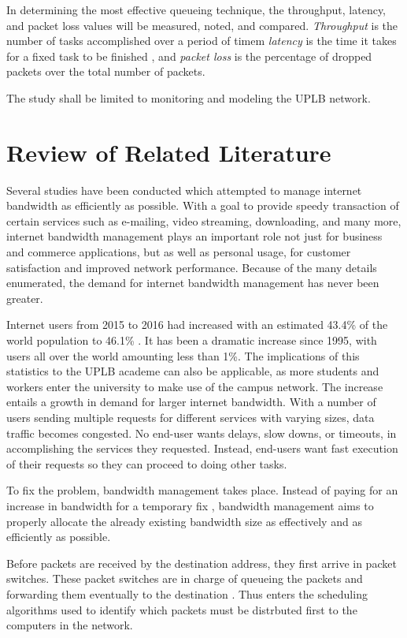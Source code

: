 \documentclass[journal]{IEEE/IEEEtran}
\begin{document}
In determining the most effective queueing technique, the throughput, latency, and packet loss values will be measured, noted, and compared. \textit{Throughput} is the number of tasks accomplished over a period of timem \textit{latency} is the time it takes for a fixed task to be finished \cite{martin_roth_nd}, and \textit{packet loss} is the percentage of dropped packets over the total number of packets.

The study shall be limited to monitoring and modeling the UPLB network.

\section{Review of Related Literature}
Several studies have been conducted which attempted to manage internet bandwidth as efficiently as possible. With a goal to provide speedy transaction of certain services such as e-mailing, video streaming, downloading, and many more, internet bandwidth management plays an important role not just for business and commerce applications, but as well as personal usage, for customer satisfaction and improved network performance. Because of the many details enumerated, the demand for internet bandwidth management has never been greater.

Internet users from 2015 to 2016 had increased with an estimated 43.4\% of the world population to 46.1\% \cite{internet_live_stats_2016}. It has been a dramatic increase since 1995, with users all over the world amounting less than 1\%. The implications of this statistics to the UPLB academe can also be applicable, as more students and workers enter the university to make use of the campus network. The increase entails a growth in demand for larger internet bandwidth. With a number of users sending multiple requests for different services with varying sizes, data traffic becomes congested. No end-user wants delays, slow downs, or timeouts, in accomplishing the services they requested. Instead, end-users want fast execution of their requests so they can proceed to doing other tasks.

To fix the problem, bandwidth management takes place. Instead of paying for an increase in bandwidth for a temporary fix \cite{communication_news_2001}, bandwidth management aims to properly allocate the already existing bandwidth size as effectively and as efficiently as possible.

Before packets are received by the destination address, they first arrive in packet switches. These packet switches are in charge of queueing the packets and forwarding them eventually to the destination \cite{comer_1999}. Thus enters the scheduling algorithms used to identify which packets must be distrbuted first to the computers in the network.
\end{document}
